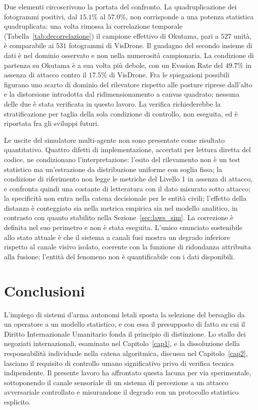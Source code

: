 \documentclass[a4paper,12pt]{report}
\begin{document}
Due elementi circoscrivono la portata del confronto. La quadruplicazione dei fotogrammi positivi, dal $15.1\%$ al $57.0\%$, non corrisponde a una potenza statistica quadruplicata: una volta rimossa la correlazione temporale (Tabella~\ref{tab:decorrelazione}) il campione effettivo di Okutama, pari a $527$ unità, è comparabile ai $531$ fotogrammi di VisDrone. Il guadagno del secondo insieme di dati è nel dominio osservato e non nella numerosità campionaria. La condizione di partenza su Okutama è a sua volta più debole, con un Evasion Rate del $49.7\%$ in assenza di attacco contro il $17.5\%$ di VisDrone. Fra le spiegazioni possibili figurano uno scarto di dominio del rilevatore rispetto alle posture riprese dall'alto e la distorsione introdotta dal ridimensionamento a canvas quadrato; nessuna delle due è stata verificata in questo lavoro. La verifica richiederebbe la stratificazione per taglia della sola condizione di controllo, non eseguita, ed è riportata fra gli sviluppi futuri.

Le uscite del simulatore multi-agente non sono presentate come risultato quantitativo. Quattro difetti di implementazione, accertati per lettura diretta del codice, ne condizionano l'interpretazione: l'esito del rilevamento non è un test statistico ma un'estrazione da distribuzione uniforme con soglia fissa; la condizione di riferimento non legge le metriche del Livello 1 in assenza di attacco, e confronta quindi una costante di letteratura con il dato misurato sotto attacco; la specificità non entra nella catena decisionale per le entità civili; l'effetto della distanza è conteggiato sia nella metrica empirica sia nel modello analitico, in contrasto con quanto stabilito nella Sezione~\ref{sec:laws_sim}. La correzione è definita nel suo perimetro e non è stata eseguita. L'unico enunciato sostenibile allo stato attuale è che il sistema a canali fusi mostra un degrado inferiore rispetto al canale visivo isolato, coerente con la funzione di ridondanza attribuita alla fusione; l'entità del fenomeno non è quantificabile con i dati disponibili.


\chapter{Conclusioni}
\label{cap6}

L'impiego di sistemi d'arma autonomi letali sposta la selezione del bersaglio da un operatore a un modello statistico, e con essa il presupposto di fatto su cui il Diritto Internazionale Umanitario fonda il principio di distinzione. Lo stallo dei negoziati internazionali, esaminato nel Capitolo~\ref{cap1}, e la dissoluzione della responsabilità individuale nella catena algoritmica, discussa nel Capitolo~\ref{cap2}, lasciano il requisito di controllo umano significativo privo di verifica tecnica indipendente. Il presente lavoro ha affrontato questa lacuna per via sperimentale, sottoponendo il canale sensoriale di un sistema di percezione a un attacco avversariale controllato e misurandone il degrado con un protocollo statistico esplicito.
\end{document}
